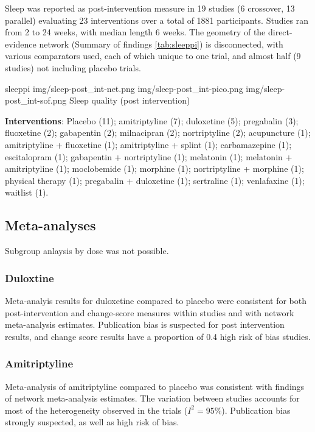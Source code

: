 \documentclass{report}\usepackage[]{graphicx}\usepackage[]{color}
\begin{document}
Sleep was reported as post-intervention measure in 19 studies (6 crossover, 13 parallel) evaluating 23 interventions over a total of 1881 participants. Studies ran from 2 to 24 weeks, with median length 6 weeks. The geometry of the direct-evidence network (Summary of findings \ref{tab:sleeppi}) is disconnected, with various comparators used, each of which unique to one trial, and almost half (9 studies) not including placebo trials.

\soffignew
{sleeppi}
{img/sleep-post_int-net.png}
{img/sleep-post_int-pico.png}
{img/sleep-post_int-sof.png}
{Sleep quality (post intervention)}

\textbf{Interventions}: Placebo (11); amitriptyline (7); duloxetine (5); pregabalin (3); fluoxetine (2); gabapentin (2); milnacipran (2); nortriptyline (2); acupuncture (1); amitriptyline + fluoxetine (1); amitriptyline + splint (1); carbamazepine (1); escitalopram (1); gabapentin + nortriptyline (1); melatonin (1); melatonin + amitriptyline (1); moclobemide (1); morphine (1); nortriptyline + morphine (1); physical therapy (1); pregabalin + duloxetine (1); sertraline (1); venlafaxine (1); waitlist (1).

\subsection{Meta-analyses}

Subgroup anlaysis by dose was not possible.

\subsubsection{Duloxtine}

Meta-analyis results for duloxetine compared to placebo were consistent for both post-intervention and change-score measures within studies and with network meta-analysis estimates. Publication bias is suspected for post intervention results, and change score results have a proportion of 0.4 high risk of bias studies.

\subsubsection{Amitriptyline}

Meta-analysis of amitriptyline compared to placebo was consistent with findings of network meta-analysis estimates. The variation between studies accounts for most of the heterogeneity observed in the trials ($I^2 = 95$\%). Publication bias strongly suspected, as well as high risk of bias.
\end{document}
